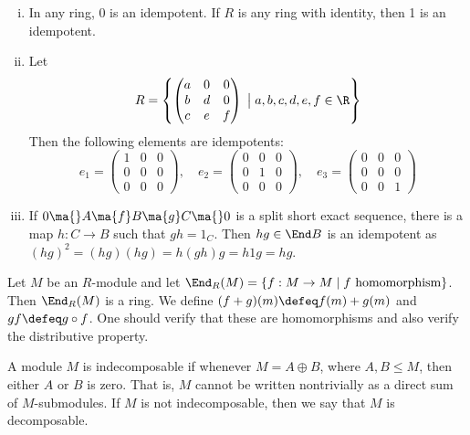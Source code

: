 \begin{ex} \hfill
\begin{enumerate}[(i)]
\item In any ring, 0 is an idempotent. If $R$ is any ring with identity, then 1 is an idempotent. 

\item Let 
	\[
	R= \left\{ \begin{pmatrix} a & 0 & 0 \\ b & d & 0 \\ c & e & f \end{pmatrix} \;\big|\; a,b,c,d,e,f \in \R \right\}
	\]
Then the following elements are idempotents:
	\[
	e_1 = \begin{pmatrix} 1 & 0 & 0 \\ 0 & 0 & 0 \\ 0 & 0 & 0 \end{pmatrix}, \quad e_2=\begin{pmatrix} 0 & 0 & 0 \\ 0 & 1 & 0 \\ 0 & 0 & 0 \end{pmatrix}, \quad e_3= \begin{pmatrix} 0 & 0 & 0 \\ 0 & 0 & 0 \\ 0 & 0 & 1 \end{pmatrix}
	\]

\item If $0 \ma{} A \ma{f} B \ma{g} C \ma{} 0$ is a split short exact sequence, there is a map $h: C \to B$ such that $gh=1_C$. Then $hg \in \End B$ is an idempotent as $(hg)^2=(hg)(hg)=h(gh)g=h1g=hg$.
\end{enumerate} \xqed
\end{ex}


Let $M$ be an $R$-module and let $\End_R(M)=\{f: M \rightarrow M\;|\; f \text{ homomorphism}\}$. Then $\End_R(M)$ is a ring. We define $(f +g)(m)\defeq f(m)+g(m)$ and $gf \defeq g\circ f$. One should verify that these are homomorphisms and also verify the distributive property.


\begin{dfn}[Indecomposable]
A module $M$ is indecomposable if whenever $M=A \oplus B$, where $A,B \leq M$, then either $A$ or $B$ is zero. That is, $M$ cannot be written nontrivially as a direct sum of $M$-submodules. If $M$ is not indecomposable, then we say that $M$ is decomposable.
\end{dfn}



